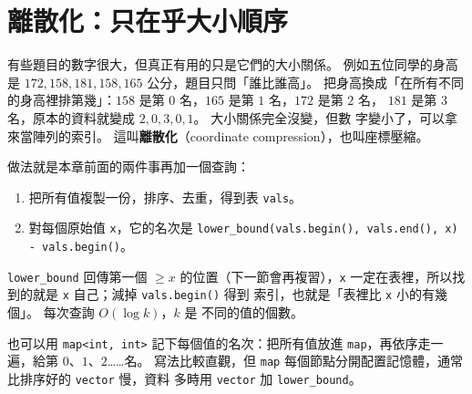 \section{離散化：只在乎大小順序}
\label{sec:srt-compress}

有些題目的數字很大，但真正有用的只是它們的大小關係。 例如五位同學的身高是
$172, 158, 181, 158, 165$ 公分，題目只問「誰比誰高」。 把身高換成「在所有不同
的身高裡排第幾」：$158$ 是第 $0$ 名，$165$ 是第 $1$ 名，$172$ 是第 $2$ 名，
$181$ 是第 $3$ 名，原本的資料就變成 $2, 0, 3, 0, 1$。 大小關係完全沒變，但數
字變小了，可以拿來當陣列的索引。 這叫\textbf{離散化}（coordinate
compression），也叫座標壓縮。

\begin{center}
\label{fig:srt-compress}
\end{center}

做法就是本章前面的兩件事再加一個查詢：

\begin{enumerate}
\item 把所有值複製一份，排序、去重，得到表 \texttt{vals}。
\item 對每個原始值 \texttt{x}，它的名次是
\texttt{lower\_bound(vals.begin(), vals.end(), x) - vals.begin()}。
\end{enumerate}

\texttt{lower\_bound} 回傳第一個 $\ge x$ 的位置（下一節會再複習），\texttt{x}
一定在表裡，所以找到的就是 \texttt{x} 自己；減掉 \texttt{vals.begin()} 得到
索引，也就是「表裡比 \texttt{x} 小的有幾個」。 每次查詢 $O(\log k)$，$k$ 是
不同的值的個數。

也可以用 \texttt{map<int, int>} 記下每個值的名次：把所有值放進
\texttt{map}，再依序走一遍，給第 $0$、$1$、$2$……名。 寫法比較直觀，但
\texttt{map} 每個節點分開配置記憶體，通常比排序好的 \texttt{vector} 慢，資料
多時用 \texttt{vector} 加 \texttt{lower\_bound}。

